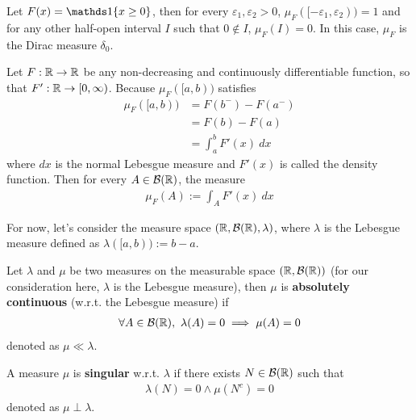 \documentclass[11pt]{article}
\numberwithin{equation}{section}
\begin{document}
	\begin{example}
	    Let $F(x) = \id{x \geq 0}$, then for every $\varepsilon_1, \varepsilon_2 > 0$, $\mu_F([-\varepsilon_1, \varepsilon_2)) = 1$ and for any other half-open interval $I$ such that $0 \notin I$, $\mu_F(I) = 0$. In this case, $\mu_F$ is the Dirac measure $\delta_0$.
	\end{example}
	
	\begin{example}
	    Let $F: \mathbb{R} \to \mathbb{R}$ be any non-decreasing and continuously differentiable function, so that $F': \mathbb{R} \to [0, \infty)$.
	    Because $\mu_F([a, b))$ satisfies
	    \begin{align}
	        \mu_F([a, b)) &= F(b^-) - F(a^-) \\
	        &= F(b) - F(a) \\
	        &= \int_a^b F'(x)\ dx
	    \end{align}
	    where $dx$ is the normal Lebesgue measure and $F'(x)$ is called the density function. Then for every $A \in \mathcal{{B}}(\mathbb{R})$, the measure
	    \begin{align}
	        \mu_F(A) := \int_A F'(x)\ dx
	    \end{align}
	\end{example}
	
	\begin{notation}
	    For now, let's consider the measure space $(\mathbb{R}, \mathcal{{B}}(\mathbb{R}), \lambda)$, where $\lambda$ is the Lebesgue measure defined as $\lambda([a, b)) := b - a$.
	\end{notation}
	
	\begin{definition}
	    Let $\lambda$ and $\mu$ be two measures on the measurable space $(\mathbb{R}, \mathcal{{B}}(\mathbb{R}))$ (for our consideration here, $\lambda$ is the Lebesgue measure), then $\mu$ is \textbf{absolutely continuous} (w.r.t. the Lebesgue measure) if
	    \begin{align}
	        \forall A \in \mathcal{{B}}(\mathbb{R}),\ \lambda(A) = 0 \implies \mu(A) = 0
	    \end{align}
	    denoted as $\mu \ll \lambda$.
	\end{definition}
	
	\begin{definition}
	    A measure $\mu$ is \textbf{singular} w.r.t. $\lambda$ if there exists $N \in \mathcal{{B}}(\mathbb{R})$ such that
	    \begin{align}
	        \lambda(N) = 0 \land \mu(N^c) = 0
	    \end{align}
	    denoted as $\mu \perp \lambda$.
	\end{definition}
	
\end{document}
